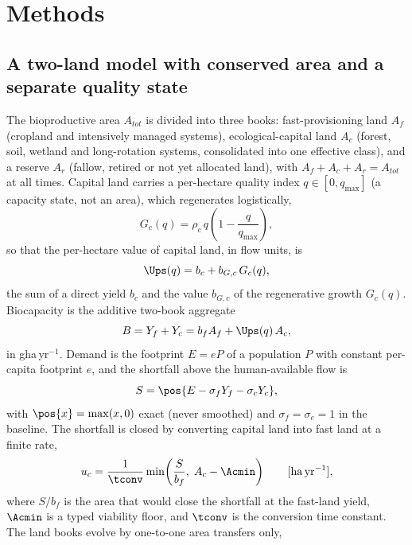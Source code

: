 \section{Methods}\label{sec:model}

\subsection{A two-land model with conserved area and a separate quality state}\label{sec:equations}

The bioproductive area $A_{tot}$ is divided into three books: fast-provisioning land $A_f$ (cropland and intensively managed systems), ecological-capital land $A_c$ (forest, soil, wetland and long-rotation systems, consolidated into one effective class), and a reserve $A_r$ (fallow, retired or not yet allocated land), with $A_f+A_c+A_r=A_{tot}$ at all times. Capital land carries a per-hectare quality index $q\in[0,q_{\max}]$ (a capacity state, not an area), which regenerates logistically,
\begin{equation}\label{eq:Gc}
G_c(q)=\rho_c\,q\left(1-\frac{q}{q_{\max}}\right),
\end{equation}
so that the per-hectare value of capital land, in flow units, is
\begin{equation}\label{eq:Ups}
\Ups(q)=b_c+b_{G,c}\,G_c(q),
\end{equation}
the sum of a direct yield $b_c$ and the value $b_{G,c}$ of the regenerative growth $G_c(q)$. Biocapacity is the additive two-book aggregate
\begin{equation}\label{eq:B}
B=Y_f+Y_c=b_f A_f+\Ups(q)\,A_c ,
\end{equation}
in gha\,yr$^{-1}$. Demand is the footprint $E=eP$ of a population $P$ with constant per-capita footprint $e$, and the shortfall above the human-available flow is
\begin{equation}\label{eq:S}
S=\pos{E-\sigma_f Y_f-\sigma_c Y_c},
\end{equation}
with $\pos{x}=\max(x,0)$ exact (never smoothed) and $\sigma_f=\sigma_c=1$ in the baseline. The shortfall is closed by converting capital land into fast land at a finite rate,
\begin{equation}\label{eq:uc}
u_c=\frac{1}{\tconv}\min\!\left(\frac{S}{b_f},\;A_c-\Acmin\right)\qquad[\mathrm{ha\,yr^{-1}}],
\end{equation}
where $S/b_f$ is the area that would close the shortfall at the fast-land yield, $\Acmin$ is a typed viability floor, and $\tconv$ is the conversion time constant. The land books evolve by one-to-one area transfers only,
